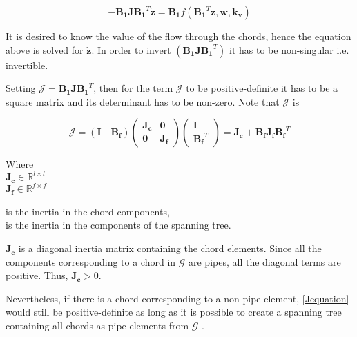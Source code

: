 \begin{equation}
 - \bm{B_1} \bm{J} \bm{{B_1}}^T \bm{\dot{z}}  = \bm{B_1} f({\bm{B_1}}^T \bm{z}, \bm{w}, \bm{k_v})
 \label{isolateZ}
 \end{equation}

It is desired to know the value of the flow through the chords, hence the equation above is solved 
for $\bm{\dot{z}}$. In order to invert $(\bm{B_1 J} \bm{{B_1}}^T)$ it has to be non-singular i.e. invertible. 

Setting $\bm{\mathcal{J}} = \bm{B_1 J} \bm{{B_1}}^T $, then for the term $\bm{\mathcal{J}}$ to be positive-definite it has to be a square matrix and its 
determinant has to be non-zero. Note that $\bm{\mathcal{J}}$ is

\begin{equation}
  \label{Jequation}
  \bm{\mathcal{J}} = (\bm{I \quad B_f}) 
  \begin{pmatrix}
    \bm{J_c}    &    \bm{0 }   \\
    \bm{0}       &   \bm{ J_f}
  \end{pmatrix}
  \begin{pmatrix}
    \bm{I}    \\
    \bm{{B_f}}^T
  \end{pmatrix}
  = \bm{J_c} + \bm{B_f J_f} \bm{{B_f}}^T
\end{equation}

\begin{minipage}[t]{0.20\textwidth}
Where\\
\hspace*{8mm} $\bm{J_c} \in \mathbb{R}^{l \times l}$  \\
\hspace*{8mm} $\bm{J_f} \in \mathbb{R}^{f \times f} $ 
\end{minipage}
\begin{minipage}[t]{0.68\textwidth}
\vspace*{2mm}
\hspace*{4mm} is the inertia in the chord components,\\
\hspace*{4mm} is the inertia in the components of the spanning tree.
\end{minipage}

$\bm{J_c}$ is a diagonal inertia matrix containing the chord elements. Since all the components corresponding to a chord in $\bm{\mathcal{G}}$ are pipes, all the 
diagonal terms are positive. Thus, $\bm{J_c} > 0$. 

Nevertheless, if there is a chord corresponding to a non-pipe element, \eqref{Jequation} 
would still be positive-definite as long as it is possible to create a spanning tree containing all chords as pipe elements from $\bm{\mathcal{G}}$ \cite{TowerModel}.

